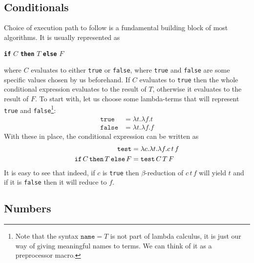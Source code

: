 \documentclass[11pt,twoside,a4paper]{article} %
\newcommand{\kw}[1]{{\bf \texttt{#1}}}
\newcommand{\mkw}[1]{{\bf \mathtt{#1}}}
\newcommand{\sym}[1]{\texttt{#1}}
\newcommand{\msym}[1]{\mathtt{#1}}
\begin{document}
\subsection{Conditionals}

Choice of execution path to follow is a fundamental building block of most
algorithms. It is usually represented as 
\begin{center}
\kw{if} $C$ \kw{then} $T$ \kw{else} $F$
\end{center}
where $C$ evaluates to either \sym{true} or \sym{false}, where \sym{true} and 
\sym{false} are some specific values chosen by us beforehand. If $C$ evaluates 
to \sym{true} then the whole conditional expression evaluates to the result of 
$T$, otherwise it evaluates to the result of $F$. To start with, let us choose 
some lambda-terms that will represent \sym{true} and \sym{false}\footnote{Note
that the syntax $\msym{name} = T$ is not part of lambda calculus, it is just
our way of giving meaningful names to terms. We can think of it as a
preprocessor macro.}:
\begin{align*}
\msym{true}  &= \lambda t.\lambda f.t \\
\msym{false} &= \lambda t.\lambda f.f
\end{align*}
With these in place, the conditional expression can be written as
\begin{align*}
\msym{test} &= \lambda c.\lambda t.\lambda f.c\,t\,f \\
\mkw{if}\,C\,\mkw{then}\,T\,\mkw{else}\,F &= \msym{test}\,C\,T\,F
\end{align*}
It is easy to see that indeed, if $c$ is \sym{true} then $\beta$-reduction of
$c\,t\,f$ will yield $t$ and if it is \sym{false} then it will reduce to $f$.

\subsection{Numbers}
\end{document}
